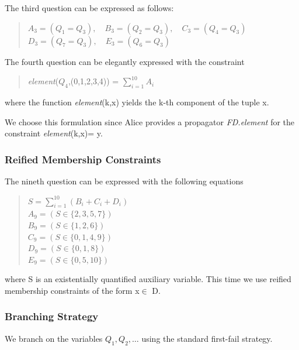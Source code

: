 \documentclass[a4paper,halfparskip]{scrartcl}
\begin{document}
The third question can be expressed as follows:
\begin{quote} 
$ A_3=(Q_1=Q_3),\quad B_3=(Q_2=Q_3),\quad C_3=(Q_4=Q_3)$\\ 
$ D_3=(Q_7=Q_3),\quad E_3=(Q_6=Q_3)$ 
\end{quote}

The fourth question can be elegantly expressed with the constraint
\begin{quote}
    \emph{element}($Q_4$,(0,1,2,3,4)) = $\sum_{i=1}^{10}{A_i}$
\end{quote}
where the function \emph{element}(k,x) yields the k-th component 
of the tuple x.

We choose this formulation since Alice provides a propagator 
\emph{FD.element} 
for the constraint \emph{element}(k,x)= y.

\subsubsection{Reified Membership Constraints}
The nineth question can be expressed with the following equations
\begin{quote}
$ S = \sum_{i=1}^{10}{(B_i+C_i+D_i)} $\\
$A_9 = (S\in\{2,3,5,7\}) $\\ 
$B_9 = (S\in\{1,2,6\}) $\\ 
$C_9 = (S\in\{0,1,4,9\}) $\\
$ D_9 = (S\in\{0,1,8\}) $\\ 
$E_9 = (S\in\{0,5,10\}) $
\end{quote}
where S is an existentially quantified auxiliary variable. 
This time we use reified membership constraints of the form x$\in$ D.

\subsubsection{Branching Strategy}
We branch on the variables $Q_1,Q_2,\ldots$ using the standard first-fail strategy.
\end{document}
